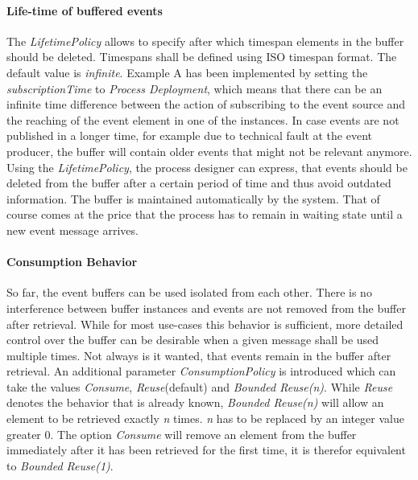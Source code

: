 \paragraph{Life-time of buffered events\newline}

The \textit{LifetimePolicy} allows to specify after which timespan elements in the buffer should be deleted. Timespans shall be defined using ISO timespan format. 
The default value is \textit{infinite}.
Example A has been implemented by setting the \textit{subscriptionTime} to \textit{Process Deployment}, which means that there can be an infinite time difference between the action of subscribing to the event source and the reaching of the event element in one of the instances. 
In case events are not published in a longer time, for example due to technical fault at the event producer, the buffer will contain older events that might not be relevant anymore.
Using the \textit{LifetimePolicy}, the process designer can express, that events should be deleted from the buffer after a certain period of time and thus avoid outdated information. The buffer is maintained automatically by the system.
That of course comes at the price that the process has to remain in waiting state until a new event message arrives.

\paragraph{Consumption Behavior\newline}
So far, the event buffers can be used isolated from each other. There is no interference between buffer instances and events are not removed from the buffer after retrieval.
While for most use-cases this behavior is sufficient, more detailed control over the buffer can be desirable when a given message shall be used multiple times.
Not always is it wanted, that events remain in the buffer after retrieval.
An additional parameter \textit{ConsumptionPolicy} is introduced which can take the values \textit{Consume}, \textit{Reuse}(default) and \textit{Bounded Reuse(n)}.
While \textit{Reuse} denotes the behavior that is already known, \textit{Bounded Reuse(n)} will allow an element to be retrieved exactly \textit{n} times. \textit{n} has to be replaced by an integer value greater 0.
The option \textit{Consume} will remove an element from the buffer immediately after it has been retrieved for the first time, it is therefor equivalent to \textit{Bounded Reuse(1)}.



